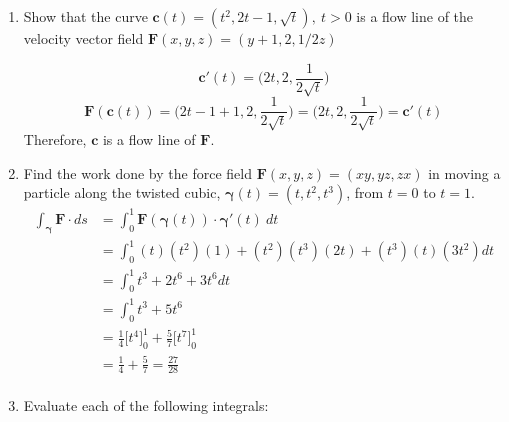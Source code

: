 \documentclass{article}
\newcommand{\gam}{\boldsymbol{\gamma}}
\begin{document}
\begin{enumerate}
    \newpage
    \item Show that the curve $\boldsymbol{c}(t) = ( t^2, 2t -1, \sqrt{t}),\ t > 0$ is a flow line of the velocity vector field $\boldsymbol{F}(x,y,z) = (y + 1,2,1/2z)$

        \[\boldsymbol{c}'(t) = \Big(2t, 2, \frac{1}{2\sqrt{t}}\Big) \]
        \[ \boldsymbol{F}(\boldsymbol{c}(t)) = \Big(2t - 1 + 1, 2, \frac{1}{2\sqrt{t}}\Big) = \Big(2t, 2, \frac{1}{2\sqrt{t}}\Big) = \boldsymbol{c}'(t) \]
        Therefore, $\boldsymbol{c}$ is a flow line of $\boldsymbol{F}$.

    \newpage
    \item Find the work done by the force field $\boldsymbol{F}(x,y,z) = (xy,yz,zx)$ in moving a particle along the twisted cubic, $\gam(t) = (t,t^2,t^3)$, from $t=0$ to $t=1$.
        \begin{align*}
            \int_{\gam} \boldsymbol{F} \cdot ds &= \int_0^1 \boldsymbol{F}(\gam(t)) \cdot \gam'(t) \ dt \\
            &= \int_0^1 (t)(t^2)(1) + (t^2)(t^3)(2t) + (t^3)(t)(3t^2)dt \\
            &= \int_0^1 t^3 + 2t^6 + 3t^6 dt\\
            &= \int_0^1 t^3 + 5t^6 \\
            &= \frac{1}{4}\Big[t^4\Big]_0^1 + \frac{5}{7}\Big[t^7\Big]_0^1\\
            &= \frac{1}{4} + \frac{5}{7} = \frac{27}{28} \\
        \end{align*}
    \newpage
    \item Evaluate each of the following integrals:
\end{enumerate}
\end{document}
